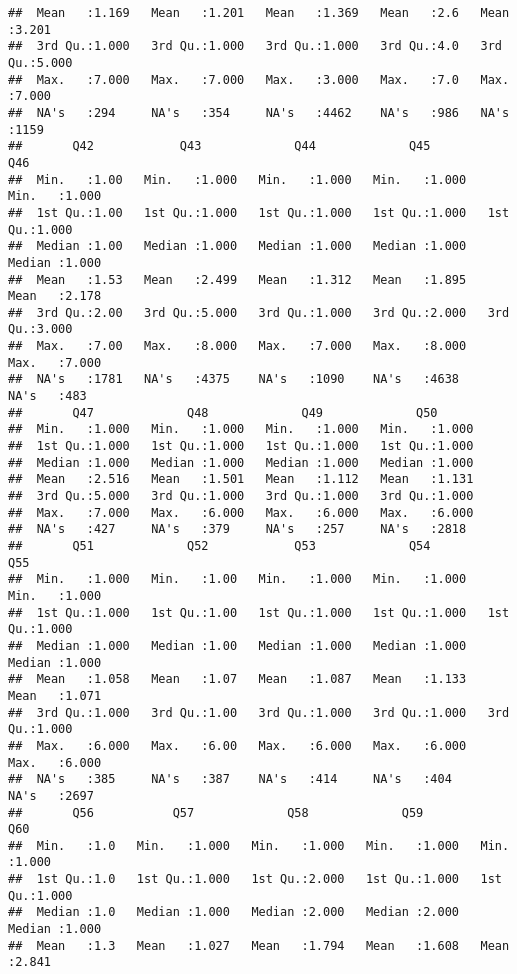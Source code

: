 \documentclass[
]{article}
\begin{document}
\begin{verbatim}
##  Mean   :1.169   Mean   :1.201   Mean   :1.369   Mean   :2.6   Mean   :3.201  
##  3rd Qu.:1.000   3rd Qu.:1.000   3rd Qu.:1.000   3rd Qu.:4.0   3rd Qu.:5.000  
##  Max.   :7.000   Max.   :7.000   Max.   :3.000   Max.   :7.0   Max.   :7.000  
##  NA's   :294     NA's   :354     NA's   :4462    NA's   :986   NA's   :1159   
##       Q42            Q43             Q44             Q45             Q46       
##  Min.   :1.00   Min.   :1.000   Min.   :1.000   Min.   :1.000   Min.   :1.000  
##  1st Qu.:1.00   1st Qu.:1.000   1st Qu.:1.000   1st Qu.:1.000   1st Qu.:1.000  
##  Median :1.00   Median :1.000   Median :1.000   Median :1.000   Median :1.000  
##  Mean   :1.53   Mean   :2.499   Mean   :1.312   Mean   :1.895   Mean   :2.178  
##  3rd Qu.:2.00   3rd Qu.:5.000   3rd Qu.:1.000   3rd Qu.:2.000   3rd Qu.:3.000  
##  Max.   :7.00   Max.   :8.000   Max.   :7.000   Max.   :8.000   Max.   :7.000  
##  NA's   :1781   NA's   :4375    NA's   :1090    NA's   :4638    NA's   :483    
##       Q47             Q48             Q49             Q50       
##  Min.   :1.000   Min.   :1.000   Min.   :1.000   Min.   :1.000  
##  1st Qu.:1.000   1st Qu.:1.000   1st Qu.:1.000   1st Qu.:1.000  
##  Median :1.000   Median :1.000   Median :1.000   Median :1.000  
##  Mean   :2.516   Mean   :1.501   Mean   :1.112   Mean   :1.131  
##  3rd Qu.:5.000   3rd Qu.:1.000   3rd Qu.:1.000   3rd Qu.:1.000  
##  Max.   :7.000   Max.   :6.000   Max.   :6.000   Max.   :6.000  
##  NA's   :427     NA's   :379     NA's   :257     NA's   :2818   
##       Q51             Q52            Q53             Q54             Q55       
##  Min.   :1.000   Min.   :1.00   Min.   :1.000   Min.   :1.000   Min.   :1.000  
##  1st Qu.:1.000   1st Qu.:1.00   1st Qu.:1.000   1st Qu.:1.000   1st Qu.:1.000  
##  Median :1.000   Median :1.00   Median :1.000   Median :1.000   Median :1.000  
##  Mean   :1.058   Mean   :1.07   Mean   :1.087   Mean   :1.133   Mean   :1.071  
##  3rd Qu.:1.000   3rd Qu.:1.00   3rd Qu.:1.000   3rd Qu.:1.000   3rd Qu.:1.000  
##  Max.   :6.000   Max.   :6.00   Max.   :6.000   Max.   :6.000   Max.   :6.000  
##  NA's   :385     NA's   :387    NA's   :414     NA's   :404     NA's   :2697   
##       Q56           Q57             Q58             Q59             Q60       
##  Min.   :1.0   Min.   :1.000   Min.   :1.000   Min.   :1.000   Min.   :1.000  
##  1st Qu.:1.0   1st Qu.:1.000   1st Qu.:2.000   1st Qu.:1.000   1st Qu.:1.000  
##  Median :1.0   Median :1.000   Median :2.000   Median :2.000   Median :1.000  
##  Mean   :1.3   Mean   :1.027   Mean   :1.794   Mean   :1.608   Mean   :2.841  

\end{verbatim}
\end{document}
